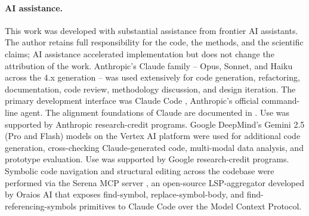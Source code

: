 \documentclass[article,shortnames,nojss]{jss}
\begin{document}
\paragraph*{AI assistance.}
This work was developed with substantial assistance from frontier
AI assistants.  The author retains full responsibility for the
code, the methods, and the scientific claims; AI assistance
accelerated implementation but does not change the attribution of
the work.  Anthropic's Claude family -- Opus, Sonnet, and Haiku
across the 4.x generation \citep{Anthropic2024ClaudeFamily} -- was
used extensively for code generation, refactoring, documentation,
code review, methodology discussion, and design iteration.  The
primary development interface was Claude Code
\citep{Anthropic2024ClaudeCode}, Anthropic's official
command-line agent.  The alignment foundations of Claude are
documented in \citet{Bai2022ConstitutionalAI}.  Use was supported
by Anthropic research-credit programs.  Google DeepMind's
Gemini 2.5 (Pro and Flash) models
\citep{GoogleDeepMind2024Gemini} on the Vertex AI platform
\citep{GoogleCloud2024VertexAI} were used for additional code
generation, cross-checking Claude-generated code, multi-modal
data analysis, and prototype evaluation.  Use was supported by
Google research-credit programs.  Symbolic code
navigation and structural editing across the codebase were
performed via the Serena MCP server \citep{Oraios2024Serena},
an open-source LSP-aggregator developed by Oraios AI that exposes
find-symbol, replace-symbol-body, and find-referencing-symbols
primitives to Claude Code over the Model Context Protocol.

\end{document}
